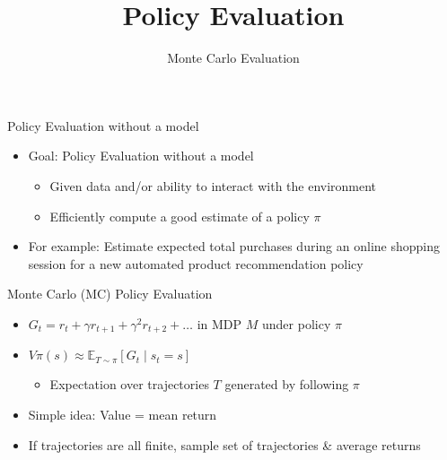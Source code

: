 


\title[Reinforcement Learning: Policy Evaluation]{Policy Evaluation}
\subtitle{Monte Carlo Evaluation}




	
	\maketitle

\begin{frame}[c]{Policy Evaluation without a model}

\begin{itemize}
	\item Goal: Policy Evaluation without a model
	\begin{itemize}
		\item  	Given data and/or ability to interact with the environment
		\item Efficiently compute a good estimate of a policy $\pi$
	\end{itemize}
	\smallskip
	\item For example: Estimate expected total purchases during an online shopping
	session for a new automated product recommendation policy
\end{itemize}



\end{frame}
\begin{frame}[c]{Monte Carlo (MC) Policy Evaluation}

\begin{itemize}
	\item $G_t = r_t + \gamma r_{t+1} + \gamma^2 r_{t+2} + \ldots$ in MDP $M$ under policy $\pi$
	\smallskip
	\item $V\pi(s) \approx \mathbb{E}_{T \sim \pi} [G_t \mid s_t = s]$
	\begin{itemize}
		\item Expectation over trajectories $T$ generated by following $\pi$
	\end{itemize}
 	\smallskip
	\item Simple idea: Value = mean return
	\item If trajectories are all finite, sample set of trajectories \& average returns
\end{itemize}

\end{frame}
